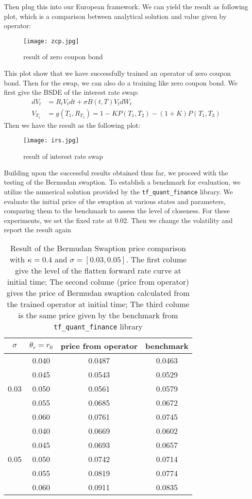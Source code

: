 \documentclass[11pt,a4paper]{article}
\theoremstyle{remark}
\begin{document}
	Then plug this into our European framework. We can yield the result as following plot, which is a comparison between analytical solution and value given by operator:
	\begin{figure}[h!]
		\centering
		\texttt{[image: zcp.jpg]}
		\caption{result of zero coupon bond}
		\label{fig:zcp}
	\end{figure}
	This plot show that we have successfully trained an operator of zero coupon bond. Then for the swap, we can also do a training like zero coupon bond. We first give the BSDE of the interest rate swap:
	\begin{align*}
		d V_t &= R_t V_t dt + \sigma B(t, T)V_t d W_t \\
		V_{T_1} &= g(T_1, R_{T_1}) = 1 - KP(T_1, T_2) - (1 + K)P(T_1, T_3)
	\end{align*}
	Then we have the result as the following plot:
	\begin{figure}[h!]
		\centering
		\texttt{[image: irs.jpg]}
		\caption{result of interest rate swap}
		\label{fig:zcp}
	\end{figure}
	Building upon the successful results obtained thus far, we proceed with the testing of the Bermudan swaption. To establish a benchmark for evaluation, we utilize the numerical solution provided by the \texttt{tf\_quant\_finance} library. We evaluate the initial price of the swaption at various states and parameters, comparing them to the benchmark to assess the level of closeness. For these experiments, we set the fixed rate at 0.02. Then we change the volatility and report the result again
	\begin{table}[htbp]
		\centering
		\begin{tabular}{cccc}
			\hline
			$\sigma$&$\theta_r = r_0$  & price from operator & benchmark \\
			\hline
			\multirow{5}{*}{0.03} &0.040 & 0.0487  & 0.0463 \\
			&0.045 & 0.0543  & 0.0529 \\
			&0.050 & 0.0561  & 0.0579 \\
			&0.055 & 0.0685  & 0.0672 \\
			&0.060 & 0.0761  & 0.0745 \\
			\hline  
			\multirow{5}{*}{0.05} & 0.040 & 0.0669  & 0.0602 \\
			&0.045 & 0.0693  & 0.0657 \\
			&0.050 & 0.0742  & 0.0714 \\
			&0.055 & 0.0819  & 0.0774 \\
			&0.060 & 0.0911  & 0.0835 \\
			\hline
			
		\end{tabular}
		\caption{Result of the Bermudan Swaption price comparison with $\kappa=0.4$ and $\sigma=[0.03, 0.05]$. The first colume give the level of the flatten forward rate curve at initial time; The second colume (price from operator) gives the price of Bermudan swaption calculated from the trained operator at initial time; The third colume is the same price given by the benchmark from \texttt{tf\_quant\_finance} library}
		\label{tab:structure1}
	\end{table}
\end{document}
